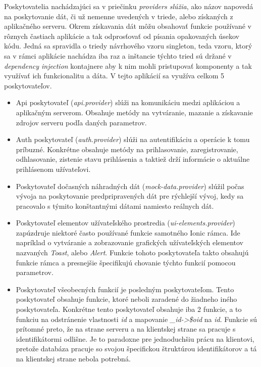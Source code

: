 Poskytovatelia nachádzajúci sa v priečinku \textit{providers slúžia}, ako názov napovedá na poskytovanie dát, či už nemenne uvedených v triede, alebo získaných z aplikačného serveru. Okrem získavania dát môžu obsahovať funkcie používané v rôznych častiach aplikácie a tak odprosťovať od písania opakovaných úsekov kódu. Jedná sa spravidla o triedy návrhového vzoru singleton, teda vzoru, ktorý sa v rámci aplikácie nachádza iba raz a inštancie týchto tried sú držané v \textit{dependency injection} kontajnere aby k nim mohli pristupovať komponenty a tak využívať ich funkcionalitu a dáta. V tejto aplikácií sa využíva celkom 5 poskytovateľov. 
\begin{itemize}
\item Api poskytovateľ (\textit{api.provider}) slúži na komunikáciu medzi aplikáciou a aplikačným serverom. Obsahuje metódy na vytváranie, mazanie a získavanie zdrojov serveru podľa daných parametrov. 
\item Auth poskytovateľ (\textit{auth.provider}) slúži na autentifikáciu a operácie k tomu príbuzné. Konkrétne obsahuje metódy na prihlasovanie, zaregistrovanie, odhlasovanie, zistenie stavu prihlásenia a taktiež drží informácie o aktuálne prihlásenom užívateľovi. 
\item Poskytovateľ dočasných náhradných dát (\textit{mock-data.provider}) slúžil počas vývoja na poskytovanie predpripravených dát pre rýchlejší vývoj, kedy sa pracovalo s týmito konštantnými dátami namiesto reálnych dát. 
\item Poskytovateľ elementov užívateľského prostredia (\textit{ui-elements.provider}) zapúzdruje niektoré často používané funkcie samotného Ionic rámca. Ide napríklad o vytváranie a zobrazovanie grafických užívateľských elementov nazvaných \textit{Toast}, alebo \textit{Alert}. Funkcie tohoto poskytovateľa takto obsahujú funkcie rámca a presnejšie špecifikujú chovanie týchto funkcií pomocou parametrov. 
\item Poskytovateľ všeobecných funkcií je posledným poskytovateľom. Tento poskytovateľ obsahuje funkcie, ktoré neboli zaradené do žiadneho iného poskytovateľa. Konkrétne tento poskytovateľ obsahuje iba 2 funkcie, a to funkciu na odstránenie vlastnosti \textit{id} a mapovanie \textit{\_id->\$oid} na \textit{id}. Funkcie sú prítomné preto, že na strane serveru a na klientskej strane sa pracuje s identifikátormi odlišne. Je to paradoxne pre jednoduchšiu prácu na klientovi, pretože databáza pracuje so svojou špecifickou štruktúrou identifikátorov a tá na klientskej strane nebola potrebná.
\end{itemize}

